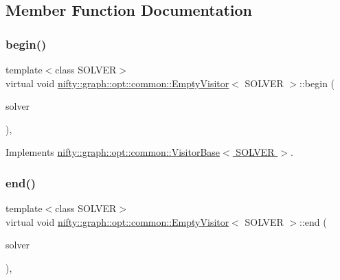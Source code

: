 \subsection{Member Function Documentation}
\mbox{\label{classnifty_1_1graph_1_1opt_1_1common_1_1EmptyVisitor_a5f9827674a0f59ada6b10a468efe85e8}} 
\subsubsection{\texorpdfstring{begin()}{begin()}}
{\footnotesize\ttfamily template$<$class S\+O\+L\+V\+ER$>$ \\
virtual void \hyperlink{classnifty_1_1graph_1_1opt_1_1common_1_1EmptyVisitor}{nifty\+::graph\+::opt\+::common\+::\+Empty\+Visitor}$<$ S\+O\+L\+V\+ER $>$\+::begin (\begin{DoxyParamCaption}\item[{\hyperlink{classnifty_1_1graph_1_1opt_1_1common_1_1VisitorBase_a433d03139897d4aefe27315b2bbb3adc}{Solver\+Type} $\ast$}]{solver }\end{DoxyParamCaption})\hspace{0.3cm}{\ttfamily [inline]}, {\ttfamily [virtual]}}



Implements \hyperlink{classnifty_1_1graph_1_1opt_1_1common_1_1VisitorBase_a8c4462a0cd838b0082f7157ad4b2d770}{nifty\+::graph\+::opt\+::common\+::\+Visitor\+Base$<$ S\+O\+L\+V\+E\+R $>$}.

\mbox{\label{classnifty_1_1graph_1_1opt_1_1common_1_1EmptyVisitor_a08d9fee2b6eb515bbec2c2ff46d2d0f4}} 
\subsubsection{\texorpdfstring{end()}{end()}}
{\footnotesize\ttfamily template$<$class S\+O\+L\+V\+ER$>$ \\
virtual void \hyperlink{classnifty_1_1graph_1_1opt_1_1common_1_1EmptyVisitor}{nifty\+::graph\+::opt\+::common\+::\+Empty\+Visitor}$<$ S\+O\+L\+V\+ER $>$\+::end (\begin{DoxyParamCaption}\item[{\hyperlink{classnifty_1_1graph_1_1opt_1_1common_1_1VisitorBase_a433d03139897d4aefe27315b2bbb3adc}{Solver\+Type} $\ast$}]{solver }\end{DoxyParamCaption})\hspace{0.3cm}{\ttfamily [inline]}, {\ttfamily [virtual]}}



